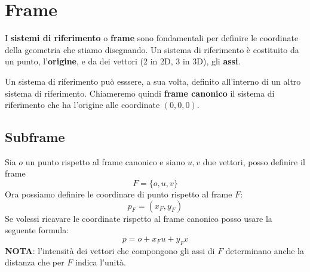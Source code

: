 \chapter{Frame}\label{frame}
I \textbf{sistemi di riferimento} o \textbf{frame} sono fondamentali per definire le coordinate della geometria che stiamo
disegnando. Un sistema di riferimento \`e costituito da un punto, l'\textbf{origine}, e da dei vettori (2 in 2D, 3 in 3D),
gli \textbf{assi}.

Un sistema di riferimento pu\`o esssere, a sua volta, definito all'interno di un altro sistema di riferimento. Chiameremo
quindi \textbf{frame canonico} il sistema di riferimento che ha l'origine alle coordinate $(0, 0, 0)$.

\section{Subframe}
Sia $o$ un punto rispetto al frame canonico e siano $u, v$ due vettori, posso definire il frame
\[ F = \{ o, u, v \} \]
Ora possiamo definire le coordinare di punto rispetto al frame $F$:
\[ p_F = (x_F, y_F) \]
Se volessi ricavare le coordinate rispetto al frame canonico posso usare la seguente formula:
\[ p = o + x_Fu + y_Fv \]
\textbf{NOTA}: l'intensit\`a dei vettori che compongono gli assi di $F$ determinano anche la distanza che per $F$ indica
l'unit\`a.


